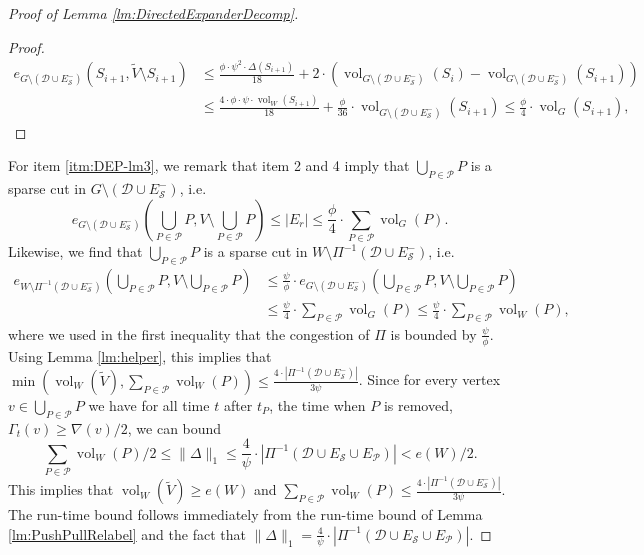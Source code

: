 \documentclass[11pt]{article}
\DeclareMathOperator{\vol}{vol}
\begin{document}
\begin{proof}[Proof of Lemma \ref{lm:DirectedExpanderDecomp}]
\begin{proof}
\begin{align*}
    e_{G \setminus \left(\mathcal{D} \cup E^-_{\mathcal{S}}\right)}(S_{i+1}, \tilde{V} \setminus S_{i+1}) &\leq \frac{\phi \cdot \psi^2\cdot \Delta(S_{i+1})}{18} + 2 \cdot \left( \operatorname{vol}_{G \setminus \left(\mathcal{D} \cup E^-_{\mathcal{S}}\right)}(S_{i}) - \operatorname{vol}_{G \setminus \left(\mathcal{D} \cup E^-_{\mathcal{S}}\right)}(S_{i+1}) \right) \\
    &\leq \frac{4 \cdot \phi \cdot \psi \cdot \operatorname{vol}_W(S_{i+1})}{18} + \frac{\phi}{36} \cdot \operatorname{vol}_{G \setminus \left(\mathcal{D} \cup E^-_{\mathcal{S}}\right)}(S_{i+1}) \leq \frac{\phi}{4} \cdot \operatorname{vol}_{G}(S_{i+1}),
\end{align*}
\end{proof}
For item \ref{itm:DEP-lm3}, we remark that item 2 and 4 imply that $\bigcup_{P \in \mathcal{P}} P$ is a sparse cut in $G \setminus \left( \mathcal{D} \cup E_{\mathcal{S}}^-\right)$, i.e. 
\[e_{G \setminus (\mathcal{D} \cup E_{\mathcal{S}}^-)}\left(\bigcup_{P \in \mathcal{P}} P, V \setminus \bigcup_{P \in \mathcal{P}} P\right) \leq |E_r| \leq \frac{\phi}{4} \cdot \sum_{P \in \mathcal{P}} \vol_G(P).\]
Likewise, we find that $\bigcup_{P \in \mathcal{P}} P$ is a sparse cut in $W \setminus \Pi^{-1}\left( \mathcal{D} \cup E_{\mathcal{S}}^-\right)$, i.e. 
\begin{align*}
    e_{W \setminus \Pi^{-1}(\mathcal{D} \cup E_{\mathcal{S}}^-)}\left(\bigcup_{P \in \mathcal{P}} P, V \setminus \bigcup_{P \in \mathcal{P}} P\right) &\leq \frac{\psi}{\phi} \cdot e_{G \setminus (\mathcal{D} \cup E_{\mathcal{S}}^-)}\left(\bigcup_{P \in \mathcal{P}} P, V \setminus \bigcup_{P \in \mathcal{P}} P\right) \\
    &\leq \frac{\psi}{4} \cdot \sum_{P \in \mathcal{P}} \vol_G(P) \leq \frac{\psi}{4} \cdot \sum_{P \in \mathcal{P}} \vol_W(P),
\end{align*}
where we used in the first inequality that the congestion of $\Pi$ is bounded by $\frac{\psi}{\phi}$. Using Lemma \ref{lm:helper}, this implies that $\min\left( \vol_W(\tilde{V}), \sum_{P \in \mathcal{P}} \vol_W(P) \right) \leq \frac{4 \cdot |\Pi^{-1}(\mathcal{D} \cup E_{\mathcal{S}}^-)|}{3 \psi}$. Since for every vertex $v \in \bigcup_{P \in \mathcal{P}} P$ we have for all time $t$ after $t_P$, the time when $P$ is removed, $\Gamma_t(v) \geq \nabla(v)/2$, we can bound 
\[\sum_{P \in \mathcal{P}} \vol_W(P)/2 \leq \|\Delta\|_1 \leq \frac{4}{\psi} \cdot |\Pi^{-1}(\mathcal{D} \cup E_{\mathcal{S}} \cup E_{\mathcal{P}})| < e(W)/2.\]
This implies that $\vol_W(\tilde{V}) \geq e(W)$ and $\sum_{P \in \mathcal{P}} \vol_W(P) \leq \frac{4 \cdot |\Pi^{-1}(\mathcal{D} \cup E_{\mathcal{S}}^-)|}{3 \psi}$. The run-time bound follows immediately from the run-time bound of Lemma \ref{lm:PushPullRelabel} and the fact that $\|\Delta\|_1 = \frac{4}{\psi} \cdot |\Pi^{-1}(\mathcal{D} \cup E_{\mathcal{S}} \cup E_{\mathcal{P}})|$.

\end{proof}
\end{document}
